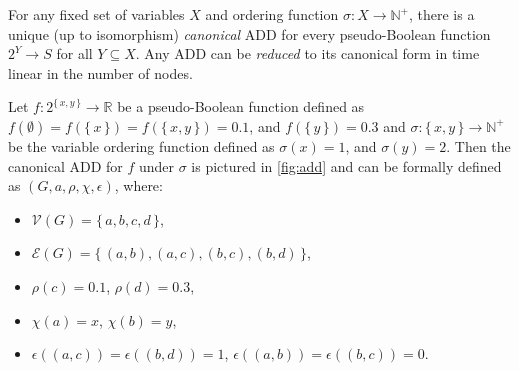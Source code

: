 \begin{fact}
  For any fixed set of variables $X$ and ordering function $\sigma\colon X \to
  \mathbb{N}^+$, there is a unique (up to isomorphism) \emph{canonical} ADD for
  every pseudo-Boolean function $2^Y \to S$ for all $Y \subseteq X$. Any ADD can
  be \emph{reduced} to its canonical form in time linear in the number of nodes.
\end{fact}

\begin{example} \label{example:add}
  Let $f\colon 2^{\{\,x, y\,\}} \to \mathbb{R}$ be a pseudo-Boolean function
  defined as $f(\emptyset) = f(\{\,x\,\}) = f(\{\,x, y\,\}) = 0.1$, and
  $f(\{\,y\,\}) = 0.3$ and $\sigma\colon \{\,x, y\,\} \to \mathbb{N}^+$ be
  the variable ordering function defined as $\sigma(x) = 1$, and $\sigma(y) =
  2$. Then the canonical ADD for $f$ under $\sigma$ is pictured in
  \cref{fig:add} and can be formally defined as $(G, a, \rho, \chi, \epsilon)$,
  where:
  \begin{itemize}
  \item $\mathcal{V}(G) = \{\,a, b, c, d\,\}$,
  \item $\mathcal{E}(G) = \{\,(a, b), (a, c), (b, c), (b, d)\,\}$,
  \item $\rho(c) = 0.1$, $\rho(d) = 0.3$,
  \item $\chi(a) = x$, $\chi(b) = y$,
  \item $\epsilon((a, c)) = \epsilon((b, d)) = 1$, $\epsilon((a, b)) =
    \epsilon((b, c)) = 0$.
  \end{itemize}
\end{example}

